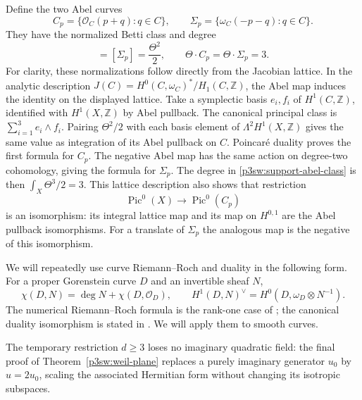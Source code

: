 \documentclass[11pt]{article}
\newcommand{\Z}{\mathbb Z}
\numberwithin{equation}{section}
\begin{document}
Define the two Abel curves
\begin{equation}
 C_p=\{\mathcal O_C(p+q):q\in C\},\qquad
 \Sigma_p=\{\omega_C(-p-q):q\in C\}.
 \label{p3sw:support-abel-curves}
\end{equation}
They have the normalized Betti class and degree
\begin{equation}
 [C_p]=[\Sigma_p]=\frac{\Theta^2}{2},\qquad
 \Theta\cdot C_p=\Theta\cdot\Sigma_p=3.
 \label{p3sw:support-abel-class}
\end{equation}
For clarity, these normalizations follow directly from the Jacobian
lattice.  In the analytic description
\(J(C)=H^0(C,\omega_C)^*/H_1(C,\Z)\), the Abel map induces the identity
on the displayed lattice.  Take a symplectic basis
\(e_i,f_i\) of \(H^1(C,\Z)\), identified with \(H^1(X,\Z)\) by Abel
pullback.  The canonical principal class is
\(\sum_{i=1}^3e_i\wedge f_i\).  Pairing \(\Theta^2/2\) with each
basis element of \(\Lambda^2H^1(X,\Z)\) gives the same value as
integration of its Abel pullback on \(C\).  Poincar\'e duality proves
the first formula for \(C_p\).  The negative Abel map has the same
action on degree-two cohomology, giving the formula for \(\Sigma_p\).
The degree in \eqref{p3sw:support-abel-class} is then \(\int_X\Theta^3/2=3\).
This lattice description also shows that restriction
\begin{equation}
 \operatorname{Pic}^0(X)\longrightarrow\operatorname{Pic}^0(C_p)
 \label{p3sw:support-abel-restriction}
\end{equation}
is an isomorphism: its integral lattice map and its map on
\(H^{0,1}\) are the Abel pullback isomorphisms.  For a translate of
\(\Sigma_p\) the analogous map is the negative of this isomorphism.

We will repeatedly use curve Riemann--Roch and duality in the following
form.  For a proper Gorenstein curve \(D\) and an invertible sheaf \(N\),
\begin{equation}
 \chi(D,N)=\deg N+\chi(D,\mathcal O_D),\qquad
 H^1(D,N)^\vee=H^0(D,\omega_D\otimes N^{-1}).
 \label{p3sw:support-curve-duality}
\end{equation}
The numerical Riemann--Roch formula is the rank-one case of
\cite[Lemma 53.5.2, Tag 0BS6]{P3SWStacks}; the canonical duality
isomorphism is stated in
\cite[Remark 53.4.3, Tag 0BS4]{P3SWStacks}.  We will apply them to smooth curves.

The temporary restriction \(d\geq3\) loses no imaginary quadratic
field: the final proof of Theorem~\ref{p3sw:weil-plane} replaces a
purely imaginary generator \(u_0\) by \(u=2u_0\), scaling the associated
Hermitian form without changing its isotropic subspaces.
\end{document}
